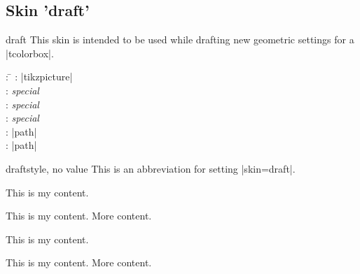 \clearpage

\subsection{Skin 'draft'}\label{subsec:draft}

\begin{docSkin}{draft}
  This skin is intended to be used while drafting new geometric settings
  for a |tcolorbox|.
\begin{tcolorbox}[skintable=draft]
  \begin{tabbing}
    : \=\kill
    :  \> |tikzpicture|\\ 
    :           \> \emph{special}\\
    : \> \emph{special}\\ 
    :        \> \emph{special}\\
    :    \> |path|\\
    :           \> |path|
  \end{tabbing}
\end{tcolorbox}
\end{docSkin}

\begin{docTcbKey}{draft}{}{style, no value}
  This is an abbreviation for setting |skin=draft|.
\end{docTcbKey}


\begin{dispExample}
\begin{tcbraster}[draft,raster equal height,raster columns=4,
    colback=LightGreen,colframe=DarkGreen,colbacktitle=LimeGreen!75!DarkGreen,
    left=1mm,right=1mm,top=1mm,bottom=1mm,middle=1mm]
  \begin{tcolorbox}
    This is my content.
  \end{tcolorbox}
  \begin{tcolorbox}
    This is my content.
    \tcblower
    More content.
  \end{tcolorbox}
  \begin{tcolorbox}[adjusted title=My title]
    This is my content.
  \end{tcolorbox}
  \begin{tcolorbox}[adjusted title=My title]
    This is my content.
    \tcblower
    More content.
  \end{tcolorbox}
\end{tcbraster}
\end{dispExample}


